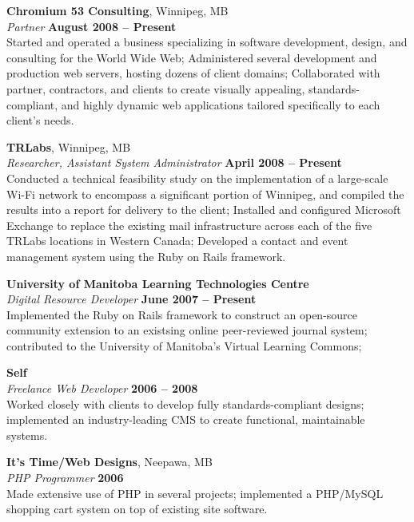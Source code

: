 \documentclass[margin,line,letterpaper]{resume}
\begin{document}
\begin{resume}
  {\bf Chromium 53 Consulting}, Winnipeg, MB \vspace{2mm}\\\vspace{1mm}%
  {\sl Partner} \hfill {\bf August 2008 -- Present}\\
  Started and operated a business specializing in software development, design, and
  consulting for the World Wide Web; Administered several development and production web servers,
  hosting dozens of client domains; Collaborated with partner, contractors, and clients to create
  visually appealing, standards-compliant, and highly dynamic web applications tailored specifically
  to each client's needs.

  {\bf TRLabs}, Winnipeg, MB \vspace{2mm}\\\vspace{1mm}%
  {\sl Researcher, Assistant System Administrator} \hfill {\bf April 2008 -- Present}\\
  Conducted a technical feasibility study on the implementation of a large-scale Wi-Fi
  network to encompass a significant portion of Winnipeg, and compiled the results into a report
  for delivery to the client; Installed and configured Microsoft Exchange to replace the
  existing mail infrastructure across each of the five TRLabs locations in Western Canada;
  Developed a contact and event management system using the Ruby on Rails framework.

  {\bf University of Manitoba Learning Technologies Centre} \vspace{2mm}\\\vspace{1mm}%
  {\sl Digital Resource Developer} \hfill {\bf June 2007 -- Present}\\
  Implemented the Ruby on Rails framework to construct an open-source
  community extension to an existsing online peer-reviewed journal system; contributed to the
  University of Manitoba's Virtual Learning Commons;

  {\bf Self} \vspace{2mm}\\\vspace{1mm}%
  {\sl Freelance Web Developer} \hfill {\bf 2006 -- 2008}\\
  Worked closely with clients to develop fully standards-compliant designs; implemented
  an industry-leading CMS to create functional, maintainable systems.

  {\bf It's Time/Web Designs}, Neepawa, MB \vspace{2mm}\\\vspace{1mm}%
  {\sl PHP Programmer} \hfill {\bf 2006}\\
  Made extensive use of PHP in several projects; implemented a PHP/MySQL shopping cart
  system on top of existing site software.


\end{resume}
\end{document}
